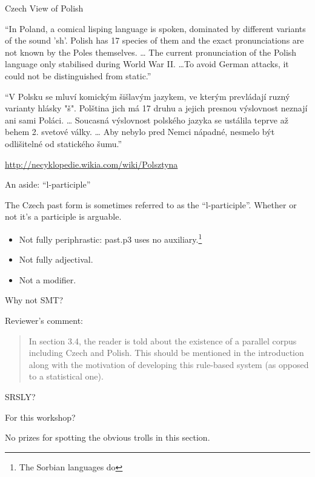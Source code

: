 \documentclass{beamer}
\begin{document}
\begin{frame}{Czech View of Polish}

\begin{center}
``In Poland, a comical lisping language is spoken, dominated by different 
variants of the sound 'sh'. Polish has 17 species of them and the exact 
pronunciations are not known by the Poles themselves. \ldots
The current pronunciation of the Polish language only stabilised during 
World War II. \ldots To avoid German attacks, it could not be distinguished 
from static.''
\end{center}

\hbox{}

{\footnotesize
``V Polsku se mluví komickým šišlavým jazykem, ve kterým prevládají ruzný 
varianty hlásky "š". Polština jich má 17 druhu a jejich presnou výslovnost 
neznají ani sami Poláci. \ldots
Soucasná výslovnost polského jazyka se ustálila teprve až behem 2. svetové 
války.
\ldots
Aby nebylo pred Nemci nápadné, nesmelo být odlišitelné od statického šumu.''}

\url{http://necyklopedie.wikia.com/wiki/Polsztyna}

\end{frame}

\begin{frame}{An aside: ``l-participle''}

The Czech past form is sometimes referred to as the ``l-participle''.
Whether or not it's a participle is arguable.

\begin{itemize}
\item Not fully periphrastic: past.p3 uses no auxiliary.\footnote{The Sorbian languages do}
\item Not fully adjectival.
\item Not a modifier.
\end{itemize}
\end{frame}

\begin{frame}{Why not SMT?}


Reviewer's comment:

\begin{quote}
In section 3.4, the reader is told about the existence of a parallel corpus 
including Czech and Polish. This should be mentioned in the introduction along 
with the motivation of developing this rule-based system 
(as opposed to a statistical one).
\end{quote}

\pause

SRSLY?

\pause

For this workshop?

\pause

No prizes for spotting the obvious trolls in this section.

\end{frame}
\end{document}
